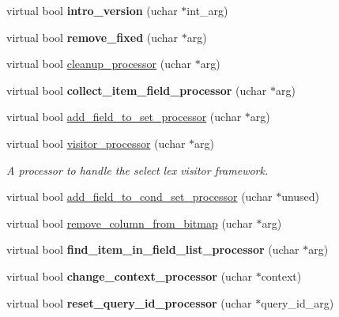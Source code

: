 \begin{DoxyCompactItemize}
virtual bool {\bfseries intro\+\_\+version} (uchar $\ast$int\+\_\+arg)
\item 
\mbox{\label{classItem_a0b35141015705c9a4ea253f5393d5af1}} 
virtual bool {\bfseries remove\+\_\+fixed} (uchar $\ast$arg)
\item 
virtual bool \mbox{\hyperlink{classItem_a92291b9ff9c01c3e6ab721a209c536c2}{cleanup\+\_\+processor}} (uchar $\ast$arg)
\item 
\mbox{\label{classItem_aa242cb5b9e525a72e6f11a80106c25a5}} 
virtual bool {\bfseries collect\+\_\+item\+\_\+field\+\_\+processor} (uchar $\ast$arg)
\item 
virtual bool \mbox{\hyperlink{classItem_ad26ce6d5e983b547db3e32efa17a36df}{add\+\_\+field\+\_\+to\+\_\+set\+\_\+processor}} (uchar $\ast$arg)
\item 
\mbox{\label{classItem_a72b136d5e806ef427a0e83b256853aa4}} 
virtual bool \mbox{\hyperlink{classItem_a72b136d5e806ef427a0e83b256853aa4}{visitor\+\_\+processor}} (uchar $\ast$arg)
\begin{DoxyCompactList}\small\item\em A processor to handle the select lex visitor framework. \end{DoxyCompactList}\item 
virtual bool \mbox{\hyperlink{classItem_a1ddf19c11395fc67c33b8bb38ce67fc7}{add\+\_\+field\+\_\+to\+\_\+cond\+\_\+set\+\_\+processor}} (uchar $\ast$unused)
\item 
virtual bool \mbox{\hyperlink{classItem_a46a9fb3471a7a0b846ce9487dce470b2}{remove\+\_\+column\+\_\+from\+\_\+bitmap}} (uchar $\ast$arg)
\item 
\mbox{\label{classItem_aad5c7f57a8a156642d46dc2dd2dfb9ed}} 
virtual bool {\bfseries find\+\_\+item\+\_\+in\+\_\+field\+\_\+list\+\_\+processor} (uchar $\ast$arg)
\item 
\mbox{\label{classItem_a37dc7522ee8c8e3de2f471badc50d593}} 
virtual bool {\bfseries change\+\_\+context\+\_\+processor} (uchar $\ast$context)
\item 
\mbox{\label{classItem_a48cc1f8cecfdca42564c220b046d65d1}} 
virtual bool {\bfseries reset\+\_\+query\+\_\+id\+\_\+processor} (uchar $\ast$query\+\_\+id\+\_\+arg)
\item 

\end{DoxyCompactItemize}
